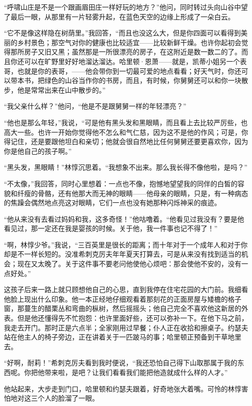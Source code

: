 \par “呼啸山庄是不是一个跟画眉田庄一样好玩的地方？”他问，同时转过头向山谷中望了最后一眼，从那里有一片轻雾升起，在蓝色天空的边缘上形成了一朵白云。
\par “它不是像这样隐在树荫里。”我回答，“而且也没这么大，但是你四面可以看得到美丽的乡村景色；那空气对你的健康也比较适宜——比较新鲜干燥。也许你起初会觉得那所房子又旧又黑；虽然那是一所很漂亮的房子，在这附近是数一数二的了。而且你还可以在旷野里好好地溜达溜达。哈里顿·恩萧——就是，凯蒂小姐另一个表哥，也就是你的表哥，——他会带你到一切最可爱的地点看看；好天气时，你还可以带本书，把绿色的山谷当作你的书房，而且，有时候，你舅舅还可以和你一块散步，他是常常出来在山中散步的。”
\par “我父亲什么样？”他问，“他是不是跟舅舅一样的年轻漂亮？”
\par “他也是那么年轻，”我说，“可是他有黑头发和黑眼睛，而且看上去比较严厉些，也高大一些。也许一开始你觉得他不怎么和气仁慈，因为这不是他的作风；可是，你得记住，还是要跟他坦白和亲切；他就会很自然地比任何舅舅还要更喜欢你，因为你是他自己的孩子啊。”
\par “黑头发，黑眼睛！”林惇沉思着。“我想象不出来。那么我长得不像他啦，是吗？”
\par “不太像，”我回答，同时心里想着：一点也不像，抱憾地望望我的同伴的白皙的容貌和纤瘦的骨骼，还有他那大而无神的眼睛——他母亲的眼睛，只是，有一种病态的焦躁会偶然地点亮这对眼睛，它们一点也没有她那种闪烁神采的痕迹。
\par “他从来没有去看过妈妈和我，这多奇怪！”他咕噜着。“他看见过我没有？要是他看见过，那一定还在我是婴孩的时候。关于他，我一件事也记不得了！”
\par “啊，林惇少爷。”我说，“三百英里是很长的距离；而十年对于一个成年人和对于你却是不一样长短的。没准希刺克厉夫年年夏天打算去，可是从来没有找到适当的机会；现在又太晚了。关于这件事不要老问他使他心烦吧：那会使他不安的，没有一点好处。”
\par 这孩子后来一路上就只顾想他自己的心思，直到我停在住宅花园的大门前。我细看他脸上现出什么印象。他一本正经地仔细观看着那刻花的正面房屋与矮檐的格子窗，那蔓生的醋栗丛和弯曲的枞树，然后摇摇头；他自己完全不喜欢他这新居的外表。但是他还懂得先不忙抱怨：也许里面好些，还可以弥补一下。在他下马之前，我走去开门。那时正是六点半；全家刚用过早餐；仆人正在收拾和擦桌子。约瑟夫站在他主人的椅子旁边，正在讲着关于一匹跛马的事；哈里顿正预备到干草地里去。
\par “好啊，耐莉！”希刺克厉夫看到我时便说，“我还恐怕自己得下山取那属于我的东西呢。你把他带来啦，是吧？让我们看看我们能把他造就成什么样的人才。”
\par 他站起来，大步走到门口，哈里顿和约瑟夫跟着，好奇地张大着嘴。可怜的林惇害怕地对这三个人的脸溜了一眼。
